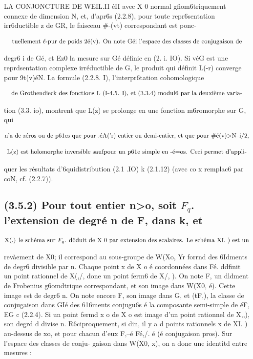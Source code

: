 \documentclass[11pt]{article}
\theoremstyle{remark}
\begin{document}
LA CONJONCTURE DE WEIL.II éII avec X 0 normal gfiom6triquement connexe de dimension N, et, d'apr6s (2.2.8), pour toute repr6sentation irr6ductible z de GR, le faisceau \#-(vt) correspondant est ponc-

\[\text{\small tuellement \(\ell\)-pur de poids 2é(v). On note Géi l'espace des classes de conjugaison de}\]

degr6 i de Gé, et Ez0 la mesure sur Gé définie en (2. i. IO). Si véG est une reprdsentation complexe irréductible de G, le produit qui définit L(-r) converge pour 9t(v)éN. La formule (2.2.8. I), l'interpr6tation cohomologique

\[\text{\small de Grothendieck des fonctions L (I-4.5. I), et (3.3.4) modul6 par la deuxième varia-}\]

tion (3.3. io), montrent que L(z) se prolonge en une fonction m6romorphe sur G, qui

\[\text{\small n'a de zéros ou de p61es que pour .éA('r) entier ou demi-entier, et que pour \#é(v)>N--i/2,}\]

\[\text{\small L(z) est holomorphe inversible saufpour un p61e simple en -é=os. Ceci permet d'appli-}\]

quer les résultats d'6quidistribution (2.1 .IO) k (2.1.12) (avec co x remplac6 par coN, cf. (2.2.7)).

\subsection*{(3.5.2) Pour tout entier n>o, soit \(F_q\). l'extension de degré n de F, dans k, et}

\[\text{\small X(.) le schéma sur \(F_q\). d6duit de X 0 par extension des scalaires. Le schéma XI. ) est un}\]

revàement de X0; il correspond au sous-groupe de W(Xo, Yr forrnd des 6Idments de degr6 divisible par n. Chaque point x de X o é coordonnées dans Fé. ddfinit un point rationnel de X(,/, done un point ferm6 de X/, ). On note F, un dldment de Frobenius g6omdtrique correspondant, et son image dans W(X0, é). Cette image est de degr6 n. On note encore F, son image dans G, et (tF,), la classe de conjugaison dans GIé des 616ments conjugu6s é la composante semi-simple de éF, EG c (2.2.4). Si un point fermd x o de X o est image d'un point rationnel de X,,), son degrd d divise n. R6ciproquement, si din, il y a d points rationnels x de XI. ) au-dessus de xo, et pour chacun d'eux F,--é Fé,/. é (é conjugaison pros). Sur l'espace des classes de conju- gaison dans W(X0, x), on a donc une identitd entre mesures :
\end{document}
